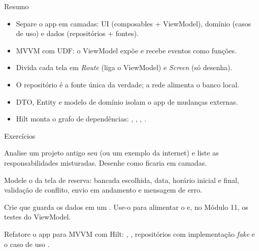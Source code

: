 \documentclass[aspectratio=169,10pt]{beamer}
\begin{document}
\begin{frame}{Resumo}
  \begin{resumo}
    \begin{itemize}
      \item Separe o app em camadas: UI (composables + ViewModel), domínio (casos de uso) e dados (repositórios + fontes).
      \item MVVM com UDF: o ViewModel expõe  e recebe eventos como funções.
      \item Divida cada tela em \emph{Route} (liga o ViewModel) e \emph{Screen} (só desenha).
      \item O repositório é a fonte única da verdade; a rede alimenta o banco local.
      \item DTO, Entity e modelo de domínio isolam o app de mudanças externas.
      \item Hilt monta o grafo de dependências: , , , .
    \end{itemize}
  \end{resumo}
\end{frame}

\begin{frame}{Exercícios}
  \begin{exercicio}
    Analise um projeto antigo seu (ou um exemplo da internet) e liste as responsabilidades misturadas. Desenhe como ficaria em camadas.
  \end{exercicio}
  \begin{exercicio}
    Modele o  da tela de reserva: bancada escolhida, data, horário inicial e final, validação de conflito, envio em andamento e mensagem de erro.
  \end{exercicio}
  \begin{exercicio}
    Crie  que guarda os dados em um . Use-o para alimentar o  e, no Módulo 11, os testes do ViewModel.
  \end{exercicio}
  \begin{projeto}
    Refatore o app para MVVM com Hilt: , , repositórios com implementação \emph{fake} e o caso de uso .
  \end{projeto}
\end{frame}
\end{document}
